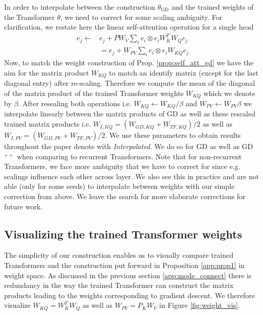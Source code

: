 \documentclass{article}
\theoremstyle{plain}
\theoremstyle{definition}
\theoremstyle{remark}
\begin{document}
In order to interpolate between the construction $\theta_{\text{GD}}$
and the trained weights of the Transformer $\theta$, we need to correct for some scaling ambiguity. For clarification, we restate here the linear self-attention operation for a single head
\begin{align}
e_j  \leftarrow & e_j + P W_{V}\sum_{i} e_{i} \otimes e_{i} W_{K}^T W_{Q}e_{j} \\
 &= e_j + W_{PV} \sum_{i} e_{i} \otimes e_{i} W_{KQ} e_{j} 
\end{align}
Now, to match the weight construction of Prop. \ref{prop:self_att_gd} we have the aim for the matrix product $W_{KQ}$ to match an identify matrix (except for the last diagonal entry) after re-scaling. Therefore we compute the mean of the diagonal of the matrix product of the trained Transformer weights $W_{KQ}$ which we denote by $\beta$.  After resealing both operations i.e. $W_{KQ} \leftarrow W_{KQ}/\beta$
and $W_{PV} \leftarrow W_{PV}\beta$ we interpolate linearly between the matrix products of GD as well as these rescaled trained matrix products i.e. $W_{I, KQ} = (W_{GD, KQ} + W_{TF, KQ})/2$ as well as 
$W_{I, PV} = (W_{GD, PV} + W_{TF, PV})/2$. We use these parameters to obtain results throughout the paper denote with \textit{Interpolated}.
We do so for GD as well as GD$^{++}$ when comparing to recurrent Transformers. Note that for non-recurrent Transformers, we face more ambiguity that we have to correct for since e.g. scalings influence each other across layer. We also see this in practice and are not able (only for some seeds) to interpolate between weights with our simple correction from above. We leave the search for more elaborate corrections for future work.  

\subsection{Visualizing the trained Transformer weights}

The simplicity of our construction enables us to visually compare trained Transformers and the construction put forward in Proposition \ref{app:prop1} in weight space. As discussed in the previous section \ref{app:mode_connect} there is redundancy in the way the trained Transformer can construct the matrix products leading to the weights corresponding to gradient descent. We therefore visualize $W_{KQ}=W^T_KW_Q$ as well as $W_{PV}=P_KW_V$ in Figure \ref{fig:weight_vis}. 
\end{document}
